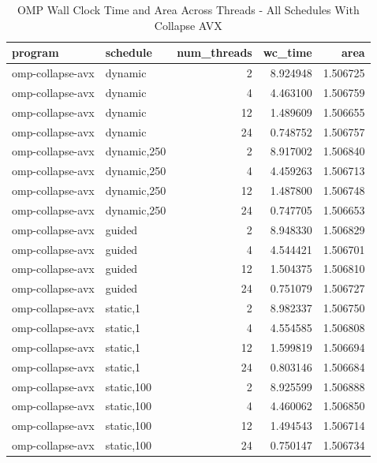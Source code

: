 \documentclass{article}
\begin{document}
\begin{table}[H]
    \centering
    \caption{OMP Wall Clock Time and Area Across Threads - All Schedules With Collapse AVX}
    \centering
    \fontsize{12}{14}\selectfont
    \begin{tabular}[t]{l|l|r|r|r}
    \hline
    program & schedule & num\_threads & wc\_time & area\\
    \hline
    omp-collapse-avx & dynamic & 2 & 8.924948 & 1.506725\\
    \hline
    omp-collapse-avx & dynamic & 4 & 4.463100 & 1.506759\\
    \hline
    omp-collapse-avx & dynamic & 12 & 1.489609 & 1.506655\\
    \hline
    omp-collapse-avx & dynamic & 24 & 0.748752 & 1.506757\\
    \hline
    omp-collapse-avx & dynamic,250 & 2 & 8.917002 & 1.506840\\
    \hline
    omp-collapse-avx & dynamic,250 & 4 & 4.459263 & 1.506713\\
    \hline
    omp-collapse-avx & dynamic,250 & 12 & 1.487800 & 1.506748\\
    \hline
    omp-collapse-avx & dynamic,250 & 24 & 0.747705 & 1.506653\\
    \hline
    omp-collapse-avx & guided & 2 & 8.948330 & 1.506829\\
    \hline
    omp-collapse-avx & guided & 4 & 4.544421 & 1.506701\\
    \hline
    omp-collapse-avx & guided & 12 & 1.504375 & 1.506810\\
    \hline
    omp-collapse-avx & guided & 24 & 0.751079 & 1.506727\\
    \hline
    omp-collapse-avx & static,1 & 2 & 8.982337 & 1.506750\\
    \hline
    omp-collapse-avx & static,1 & 4 & 4.554585 & 1.506808\\
    \hline
    omp-collapse-avx & static,1 & 12 & 1.599819 & 1.506694\\
    \hline
    omp-collapse-avx & static,1 & 24 & 0.803146 & 1.506684\\
    \hline
    omp-collapse-avx & static,100 & 2 & 8.925599 & 1.506888\\
    \hline
    omp-collapse-avx & static,100 & 4 & 4.460062 & 1.506850\\
    \hline
    omp-collapse-avx & static,100 & 12 & 1.494543 & 1.506714\\
    \hline
    omp-collapse-avx & static,100 & 24 & 0.750147 & 1.506734\\
    \hline
    \end{tabular}
\end{table}
\end{document}
